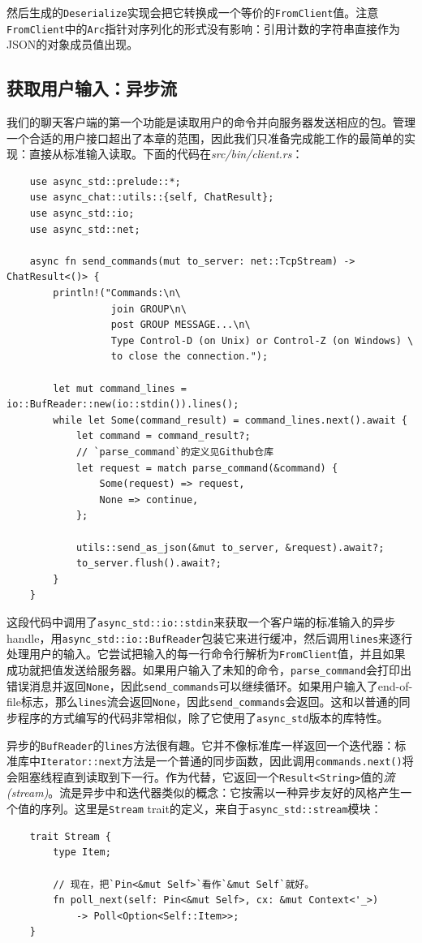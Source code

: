 然后生成的\texttt{Deserialize}实现会把它转换成一个等价的\texttt{FromClient}值。注意\texttt{FromClient}中的\texttt{Arc}指针对序列化的形式没有影响：引用计数的字符串直接作为JSON的对象成员值出现。

\subsection{获取用户输入：异步流}
我们的聊天客户端的第一个功能是读取用户的命令并向服务器发送相应的包。管理一个合适的用户接口超出了本章的范围，因此我们只准备完成能工作的最简单的实现：直接从标准输入读取。下面的代码在\emph{src/bin/client.rs}：
\begin{verbatim}
    use async_std::prelude::*;
    use async_chat::utils::{self, ChatResult};
    use async_std::io;
    use async_std::net;

    async fn send_commands(mut to_server: net::TcpStream) -> ChatResult<()> {
        println!("Commands:\n\
                  join GROUP\n\
                  post GROUP MESSAGE...\n\
                  Type Control-D (on Unix) or Control-Z (on Windows) \
                  to close the connection.");

        let mut command_lines = io::BufReader::new(io::stdin()).lines();
        while let Some(command_result) = command_lines.next().await {
            let command = command_result?;
            // `parse_command`的定义见Github仓库
            let request = match parse_command(&command) {
                Some(request) => request,
                None => continue,
            };

            utils::send_as_json(&mut to_server, &request).await?;
            to_server.flush().await?;
        }
    }
\end{verbatim}

这段代码中调用了\texttt{async\_std::io::stdin}来获取一个客户端的标准输入的异步handle，用\texttt{async\_std::io::BufReader}包装它来进行缓冲，然后调用\texttt{lines}来逐行处理用户的输入。它尝试把输入的每一行命令行解析为\texttt{FromClient}值，并且如果成功就把值发送给服务器。如果用户输入了未知的命令，\texttt{parse\_command}会打印出错误消息并返回\texttt{None}，因此\texttt{send\_commands}可以继续循环。如果用户输入了end-of-file标志，那么\texttt{lines}流会返回\texttt{None}，因此\texttt{send\_commands}会返回。这和以普通的同步程序的方式编写的代码非常相似，除了它使用了\texttt{async\_std}版本的库特性。

异步的\texttt{BufReader}的\texttt{lines}方法很有趣。它并不像标准库一样返回一个迭代器：标准库中\texttt{Iterator::next}方法是一个普通的同步函数，因此调用\texttt{commands.next()}将会阻塞线程直到读取到下一行。作为代替，它返回一个\texttt{Result<String>}值的\emph{流(stream)}。流是异步中和迭代器类似的概念：它按需以一种异步友好的风格产生一个值的序列。这里是\texttt{Stream} trait的定义，来自于\texttt{async\_std::stream}模块：
\begin{verbatim}
    trait Stream {
        type Item;

        // 现在，把`Pin<&mut Self>`看作`&mut Self`就好。
        fn poll_next(self: Pin<&mut Self>, cx: &mut Context<'_>)
            -> Poll<Option<Self::Item>>;
    }
\end{verbatim}

